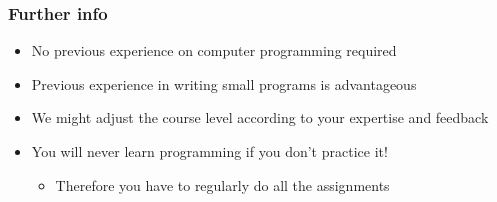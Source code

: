 \documentclass{beamer}%
\begin{document}
%  


\begin{frame}
\frametitle{Further info}
\begin{itemize}
\item No previous experience on computer programming required
\item Previous experience in writing small programs is advantageous
\item We might adjust the course level according to your expertise and feedback
\pause
\item You will never learn  programming if you don't practice it!
\begin{itemize}
\item \color{red}Therefore you have to regularly do all the assignments
\end{itemize}
\end{itemize}
\end{frame}
\end{document}
